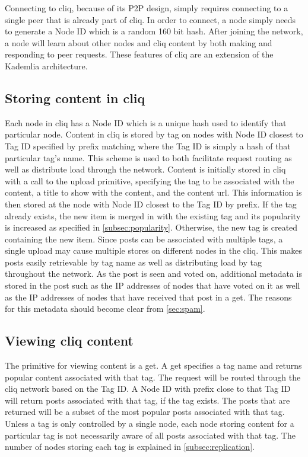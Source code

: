 \documentclass{sig-alternate}
\begin{document}
Connecting to cliq, because of its P2P design, simply requires connecting to a single peer that is already part of cliq. 
In order to connect, a node simply needs to generate a Node ID which is a random 160 bit hash. 
After joining the network, a node will learn about other nodes and cliq content by both making and responding to peer requests. 
These features of cliq are an extension of the Kademlia architecture.

\subsection{Storing content in cliq}
\label{subsec:upload}

Each node in cliq has a Node ID which is a unique hash used to identify that particular node. 
Content in cliq is stored by tag on nodes with Node ID closest to Tag ID specified by prefix matching where the Tag ID is simply a hash of that particular tag's name. 
This scheme is used to both facilitate request routing as well as distribute load through the network. 
Content is initially stored in cliq with a call to the upload primitive, specifying the tag to be associated with the content, a title to show with the content, and the content url. 
This information is then stored at the node with Node ID closest to the Tag ID by prefix. 
If the tag already exists, the new item is merged in with the existing tag and its popularity is increased as specified in \ref{subsec:popularity}. 
Otherwise, the new tag is created containing the new item. 
Since posts can be associated with multiple tags, a single upload may cause multiple stores on different nodes in the cliq. 
This makes posts easily retrievable by tag name as well as distributing load by tag throughout the network. 
As the post is seen and voted on, additional metadata is stored in the post such as the IP addresses of nodes that have voted on it as well as the IP addresses of nodes that have received that post in a get. 
The reasons for this metadata should become clear from \ref{sec:spam}. 

\subsection{Viewing cliq content}

The primitive for viewing content is a get. 
A get specifies a tag name and returns popular content associated with that tag. 
The request will be routed through the cliq network based on the Tag ID. 
A Node ID with prefix close to that Tag ID will return posts associated with that tag, if the tag exists. 
The posts that are returned will be a subset of the most popular posts associated with that tag. 
Unless a tag is only controlled by a single node, each node storing content for a particular tag is not necessarily aware of all posts associated with that tag. 
The number of nodes storing each tag is explained in \ref{subsec:replication}. 
\end{document}
